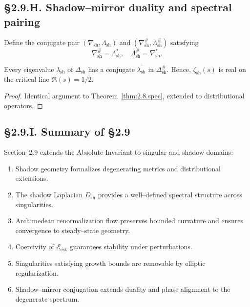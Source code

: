\subsection*{§2.9.H. Shadow–mirror duality and spectral pairing}

\begin{definition}
Define the conjugate pair $(\nabla_{\mathrm{sh}},\Lambda_{\mathrm{sh}})$ and
$(\nabla_{\mathrm{sh}}^\#,\Lambda_{\mathrm{sh}}^\#)$ satisfying
\[
\nabla_{\mathrm{sh}}^\# = \Lambda_{\mathrm{sh}}^\ast,\quad
\Lambda_{\mathrm{sh}}^\# = \nabla_{\mathrm{sh}}^\ast.
\]
\]
\end{definition}

\begin{theorem}\label{thm:2.9.pair}
Every eigenvalue $\lambda_{\mathrm{sh}}$ of $\Delta_{\mathrm{sh}}$
has a conjugate $\overline{\lambda_{\mathrm{sh}}}$ in $\Delta_{\mathrm{sh}}^\#$.
Hence, $\zeta_{\mathrm{sh}}(s)$ is real on the critical line $\Re(s)=1/2$.
\end{theorem}

\begin{proof}
Identical argument to Theorem~\ref{thm:2.8.spec}, extended to distributional operators.
\end{proof}

\subsection*{§2.9.I. Summary of §2.9}

Section~2.9 extends the Absolute Invariant to singular and shadow domains:
\begin{enumerate}
  \item Shadow geometry formalizes degenerating metrics and distributional extensions.
  \item The shadow Laplacian $D_{\mathrm{sh}}$ provides a well–defined spectral structure across singularities.
  \item Archimedean renormalization flow preserves bounded curvature and ensures convergence to steady–state geometry.
  \item Coercivity of $\mathcal{E}_{\mathrm{ext}}$ guarantees stability under perturbations.
  \item Singularities satisfying growth bounds are removable by elliptic regularization.
  \item Shadow–mirror conjugation extends duality and phase alignment to the degenerate spectrum.
\end{enumerate}

